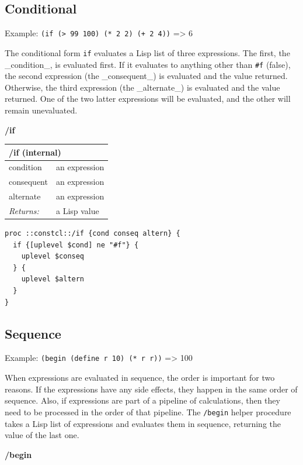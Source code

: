 \documentclass[twoside,9pt]{report}
\begin{document}
\subsection{Conditional}
\label{conditional}

Example: \texttt{(if (> 99 100) (* 2 2) (+ 2 4))} => 6


The conditional form \texttt{if} evaluates a Lisp list of three expressions. The first, the \_condition\_, is evaluated first. If it evaluates to anything other than \texttt{\#f} (false), the second expression (the \_consequent\_) is evaluated and the value returned. Otherwise, the third expression (the \_alternate\_) is evaluated and the value returned. One of the two latter expressions will be evaluated, and the other will remain unevaluated.


\textbf{/if}

\begin{tabular}{ |l l| }
\hline
\multicolumn{2}{|l|}{/if (internal)} \\
\hline
condition & an expression \\
consequent & an expression \\
alternate & an expression \\
\textit{Returns:} & a Lisp value \\
\hline
\end{tabular}

\noindent\makebox[\linewidth]{\rule{\linewidth}{0.4pt}}
\begin{lstlisting}
proc ::constcl::/if {cond conseq altern} {
  if {[uplevel $cond] ne "#f"} {
    uplevel $conseq
  } {
    uplevel $altern
  }
}
\end{lstlisting}
\noindent\makebox[\linewidth]{\rule{\linewidth}{0.4pt}}
\subsection{Sequence}
\label{sequence}

Example: \texttt{(begin (define r 10) (* r r))} => 100


When expressions are evaluated in sequence, the order is important for two reasons. If the expressions have any side effects, they happen in the same order of sequence. Also, if expressions are part of a pipeline of calculations, then they need to be processed in the order of that pipeline. The \texttt{/begin} helper procedure takes a Lisp list of expressions and evaluates them in sequence, returning the value of the last one.


\textbf{/begin}
\end{document}
